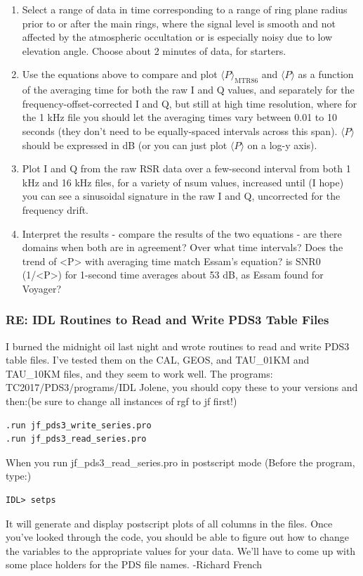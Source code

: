 \documentclass[crop=false,class=book]{standalone}
\begin{document}
\begin{enumerate}
    \item Select a range of data in time corresponding to a range of ring plane radius prior to or after the main rings, where the signal level is smooth and not affected by the atmospheric occultation or is especially noisy due to low elevation angle. Choose about 2 minutes of data, for starters.
    \item Use the equations above to compare and plot $\langle P\rangle_{\textrm{MTR86}}$ and $\langle P \rangle$ as a function of the averaging time for both the raw I and Q values, and separately for the frequency-offset-corrected I and Q, but still at high time resolution, where for the 1 kHz file you should let the averaging times vary between 0.01 to 10 seconds (they don't need to be equally-spaced intervals across this span). $\langle P \rangle$ should be expressed in dB (or you can just plot $\langle P \rangle$ on a log-y axis).
    \item Plot I and Q from the raw RSR data over a few-second interval from both 1 kHz and 16 kHz files, for a variety of nsum values, increased until (I hope) you can see a sinusoidal signature in the raw I and Q, uncorrected for the frequency drift.
    \item Interpret the results - compare the results of the two equations - are there domains when both are in agreement? Over what time intervals? Does the trend of <P> with averaging time match Essam's equation? is SNR0 (1/<P>) for 1-second time averages about 53 dB, as Essam found for Voyager?
\end{enumerate}
\subsubsection{\footnotesize RE: IDL Routines to Read and Write PDS3 Table Files}
I burned the midnight oil last night and wrote routines to read and write PDS3 table files. I've tested them on the CAL, GEOS, and TAU\_01KM and TAU\_10KM files, and they seem to work well. The programs: TC2017/PDS3/programs/IDL
Jolene, you should copy these to your versions and then:(be sure to change all instances of rgf to jf first!)
\begin{lstlisting}[language=IDL]
.run jf_pds3_write_series.pro
.run jf_pds3_read_series.pro
\end{lstlisting}
When you run jf\_pds3\_read\_series.pro in postscript mode (Before the program, type:)
\begin{lstlisting}[language=IDL]
IDL> setps
\end{lstlisting}
It will generate and display postscript plots of all columns in the files. Once you've looked through the code, you should be able to figure out how to change the variables to the appropriate values for your data. We'll have to come up with some place holders for the PDS file names. -Richard French
\end{document}
